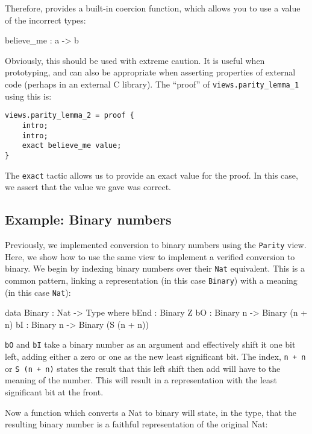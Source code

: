 Therefore, \Idris{} provides a built-in coercion function, which allows you to use a value of the incorrect types:

\begin{code}
believe_me : a -> b 
\end{code}

\noindent
Obviously, this should be used with extreme caution.
It is useful when prototyping, and can also be appropriate when asserting properties of external code (perhaps in an external C library). The ``proof'' of \texttt{views.parity\_lemma\_1} using this is:

\begin{lstlisting}[style=stdout]
views.parity_lemma_2 = proof {
    intro;
    intro;
    exact believe_me value;
}
\end{lstlisting}

\noindent
The \texttt{exact} tactic allows us to provide an exact value for the proof.
In this case, we assert that the value we gave was correct.

\subsection{Example: Binary numbers}

Previously, we implemented conversion to binary numbers using the \texttt{Parity} view.
Here, we show how to use the same view to implement a verified conversion to binary.
We begin by indexing binary numbers over their \texttt{Nat} equivalent.
This is a common pattern, linking a representation (in this case \texttt{Binary}) with a meaning (in this case \texttt{Nat}):

\begin{code}
data Binary : Nat -> Type where
   bEnd : Binary Z
   bO : Binary n -> Binary (n + n)
   bI : Binary n -> Binary (S (n + n))
\end{code}

\noindent
\texttt{bO} and \texttt{bI} take a binary number as an argument and effectively shift it one bit left, adding either a zero or one as the new least significant bit.
The index, \texttt{n + n} or \texttt{S (n + n)} states the result that this left shift then add will have to the meaning of the number.
This will result in a representation with the least significant bit at the front.

Now a function which converts a Nat to binary will state, in the type, that the resulting binary number is a faithful representation of the original Nat:

